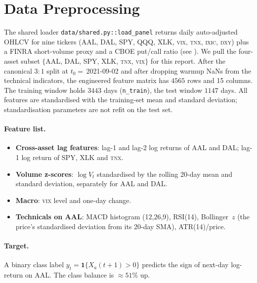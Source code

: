 \documentclass[runningheads]{llncs}
\begin{document}
\section{Data Preprocessing}\label{sec:data}
The shared loader \verb|data/shared.py::load_panel| returns daily
auto-adjusted OHLCV for nine tickers (AAL, DAL, SPY, QQQ, XLK,
\textsc{vix}, \textsc{tnx}, \textsc{ixic}, \textsc{dxy}) plus a FINRA
short-volume proxy and a CBOE put/call ratio (see \cite{whaley2000}).
We pull the four-asset subset $\{$AAL, DAL, SPY, XLK, \textsc{tnx},
\textsc{vix}$\}$ for this report. After the canonical
$3{:}1$ split at $t_{0}{=}\,$2021-09-02 and after dropping warmup
NaNs from the technical indicators, the engineered feature matrix has
$\num{4565}$ rows and 15 columns. The training window holds
$\num{3443}$ days (\verb|n_train|), the test window
$\num{1147}$ days. All features are standardised with the
training-set mean and standard deviation; standardisation parameters
are not refit on the test set.

\paragraph{Feature list.}
\begin{itemize}
\item \textbf{Cross-asset lag features}: lag-1 and lag-2 log returns of
AAL and DAL; lag-1 log return of SPY, XLK and \textsc{tnx}.
\item \textbf{Volume z-scores}: $\log V_t$ standardised by the rolling
20-day mean and standard deviation, separately for AAL and DAL.
\item \textbf{Macro}: \textsc{vix} level and one-day change.
\item \textbf{Technicals on AAL}: MACD histogram (12,26,9), RSI(14),
Bollinger~$z$ (the price's standardised deviation from its 20-day SMA),
ATR(14)/price.
\end{itemize}

\paragraph{Target.} A binary class label
$y_{t}{=}\mathbf{1}\{X_a(t{+}1){>}0\}$ predicts the sign of next-day
log-return on AAL. The class balance is $\approx 51\%$ up.

\end{document}
